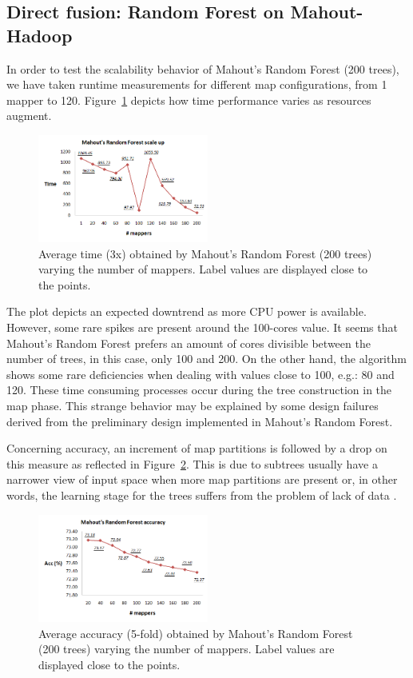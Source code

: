 \documentclass[3p,review]{elsarticle}
\begin{document}
\subsection{Direct fusion: Random Forest on Mahout-Hadoop}
\label{subsec:rfmahout}

In order to test the scalability behavior of Mahout's Random Forest (200 trees), we have taken runtime measurements for different map configurations, from 1 mapper to 120. Figure~\ref{fig:rf-mahout} depicts how time performance varies as resources augment.

\begin{figure}[!htp]
    \centering
    \includegraphics[width=0.5\textwidth]{rf-mahout}
    \caption{Average time (3x) obtained by Mahout's Random Forest (200 trees) varying the number of mappers. Label values are displayed close to the points.}
    \label{fig:rf-mahout}
\end{figure}

The plot depicts an expected downtrend as more CPU power is available. However, some rare spikes are present around the 100-cores value. It seems that Mahout's Random Forest prefers an amount of cores divisible between the number of trees, in this case, only 100 and 200. On the other hand, the algorithm shows some rare deficiencies when dealing with values close to 100, e.g.: 80 and 120. These time consuming processes occur during the tree construction in the map phase. This strange behavior may be explained by some design failures derived from the preliminary design implemented in Mahout's Random Forest.

Concerning accuracy, an increment of map partitions is followed by a drop on this measure as reflected in Figure~\ref{fig:rf-mahout-pred}. This is due to subtrees usually have a narrower view of input space when more map partitions are present or, in other words, the learning stage for the trees suffers from the problem of lack of data \cite{Fer17}.

\begin{figure}[!htp]
    \centering
    \includegraphics[width=0.5\textwidth]{rf-mahout-acc}
    \caption{Average accuracy (5-fold) obtained by Mahout's Random Forest (200 trees) varying the number of mappers. Label values are displayed close to the points.}
    \label{fig:rf-mahout-pred}
\end{figure}
\end{document}

